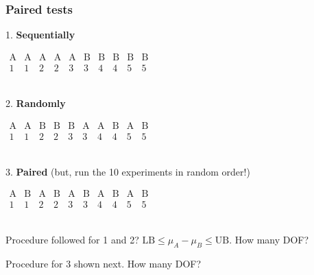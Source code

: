 \begin{frame}\frametitle{Paired tests}

	1. \textbf{Sequentially} {\color{myOrange}{(don't ever do this!)}}

	$
	\begin{array}{cccccccccc}
		\text{A} & \text{A} & \text{A} & \text{A} & \text{A} & \text{B} & \text{B} & \text{B} & \text{B} & \text{B} \\
		1 & 1 & 2 & 2 & 3 & 3 & 4 & 4 & 5 & 5\\
	\end{array}
	$

	$\qquad$

	2. \textbf{Randomly} {\color{myOrange}{(commonality between pairs will not cancel)}}

	$
	\begin{array}{cccccccccc}
		\text{A} & \text{A} & \text{B} & \text{B} & \text{B} & \text{A} & \text{A} & \text{B} & \text{A} & \text{B} \\
		1 & 1 & 2 & 2 & 3 & 3 & 4 & 4 & 5 & 5\\
	\end{array}
	$

	$\qquad$

	3. \textbf{Paired} (but, run the 10 experiments in random order!)

	$
	\begin{array}{cccccccccc}
		\text{A} & \text{B} & \text{A} & \text{B} & \text{A} & \text{B} & \text{A} & \text{B} & \text{A} & \text{B} \\
		1 & 1 & 2 & 2 & 3 & 3 & 4 & 4 & 5 & 5\\
	\end{array}
	$

	$\qquad$

	Procedure followed for 1 and 2? $\text{LB} \leq \mu_A - \mu_B \leq \text{UB}$. How many DOF?

	Procedure for 3 shown next. How many DOF?
\end{frame}

